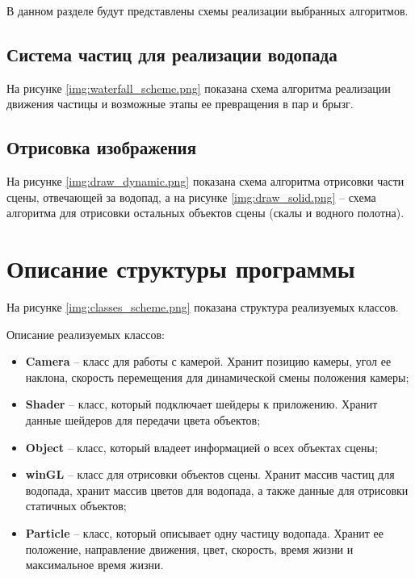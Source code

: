 В данном разделе будут представлены схемы реализации выбранных алгоритмов.

\subsection{Система частиц для реализации водопада}

На рисунке \ref{img:waterfall_scheme.png} показана схема алгоритма реализации движения частицы и возможные этапы ее превращения в пар и брызг.



\subsection{Отрисовка изображения}

На рисунке \ref{img:draw_dynamic.png} показана схема алгоритма отрисовки части сцены, отвечающей за водопад, а на рисунке \ref{img:draw_solid.png} -- схема алгоритма для отрисовки остальных объектов сцены (скалы и водного полотна).


\clearpage


\section{Описание структуры программы}

На рисунке \ref{img:classes_scheme.png} показана структура реализуемых классов.


\clearpage

Описание реализуемых классов:

\begin{itemize}
    \item \textbf{Camera} -- класс для работы с камерой. Хранит позицию камеры, угол ее наклона, скорость перемещения для динамической смены положения камеры;
    \item \textbf{Shader} -- класс, который подключает шейдеры к приложению. Хранит данные шейдеров для передачи цвета объектов;
    \item \textbf{Object} -- класс, который владеет информацией о всех объектах сцены;
    \item \textbf{winGL} -- класс для отрисовки объектов сцены. Хранит массив частиц для водопада, хранит массив цветов для водопада, а также данные для отрисовки статичных объектов;
    \item \textbf{Particle} -- класс, который описывает одну частицу водопада. Хранит ее положение, направление движения, цвет, скорость, время жизни и максимальное время жизни. 
\end{itemize}


